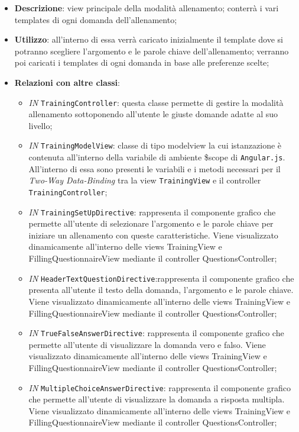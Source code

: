 \begin{itemize}
	\item \textbf{Descrizione}: view principale della modalità allenamento; conterrà i vari templates di ogni domanda dell'allenamento;
	\item \textbf{Utilizzo}: all'interno di essa verrà caricato inizialmente il template dove si potranno scegliere l'argomento e le parole chiave dell'allenamento; verranno poi caricati i templates di ogni domanda in base alle preferenze scelte; 
	\item \textbf{Relazioni con altre classi}:
	\begin{itemize}
		\item \textit{IN} \texttt{TrainingController}: questa classe permette di gestire la modalità allenamento sottoponendo all'utente le giuste domande adatte al suo livello;
		\item \textit{IN} \texttt{TrainingModelView}: classe di tipo modelview la cui istanzazione è contenuta all'interno della variabile di ambiente \$scope di \texttt{Angular.js}. All'interno di essa sono presenti le variabili e i metodi necessari per il \textit{Two-Way Data-Binding} tra la view \texttt{TrainingView} e il controller \texttt{TrainingController};
		\item \textit{IN} \texttt{TrainingSetUpDirective}: rappresenta il componente grafico che permette all'utente di selezionare l'argomento e le parole chiave per iniziare un allenamento con queste caratteristiche. Viene visualizzato	dinamicamente all'interno delle views TrainingView e FillingQuestionnaireView mediante il controller QuestionsController;
		\item \textit{IN} \texttt{HeaderTextQuestionDirective}:rappresenta il componente grafico che presenta all'utente il testo della domanda, l'argomento e le parole chiave. Viene visualizzato dinamicamente all'interno delle views TrainingView e FillingQuestionnaireView mediante il controller QuestionsController;
		\item \textit{IN} \texttt{TrueFalseAnswerDirective}: rappresenta il componente grafico che permette all'utente di visualizzare la domanda vero e falso. Viene visualizzato dinamicamente all'interno delle views TrainingView e FillingQuestionnaireView mediante il controller QuestionsController;
		\item \textit{IN} \texttt{MultipleChoiceAnswerDirective}: rappresenta il componente grafico che permette all'utente di visualizzare la domanda a risposta multipla. Viene visualizzato dinamicamente all'interno delle views TrainingView e FillingQuestionnaireView mediante il controller QuestionsController;

\end{itemize}
\end{itemize}
